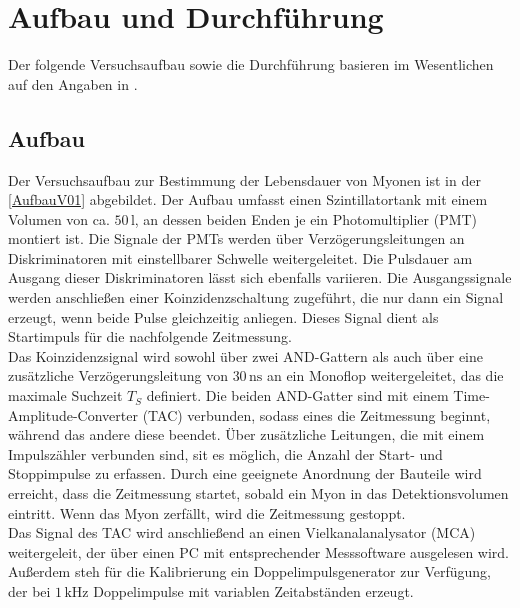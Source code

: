 \section{Aufbau und Durchführung}
Der folgende Versuchsaufbau sowie die Durchführung basieren im Wesentlichen auf den Angaben in \cite{anleitungV01}.
\subsection{Aufbau}
\label{Aufbau}
Der Versuchsaufbau zur Bestimmung der Lebensdauer von Myonen ist in der \autoref{AufbauV01} abgebildet.
Der Aufbau umfasst einen Szintillatortank mit einem Volumen von ca. $50\,\unit{\litre}$, an dessen beiden Enden je ein Photomultiplier (PMT) montiert ist. Die Signale der PMTs werden über
Verzögerungsleitungen an Diskriminatoren mit einstellbarer Schwelle weitergeleitet. Die Pulsdauer am Ausgang dieser Diskriminatoren lässt sich ebenfalls
variieren. Die Ausgangssignale werden anschließen einer Koinzidenzschaltung zugeführt, die nur dann ein Signal erzeugt, wenn beide Pulse gleichzeitig anliegen.
Dieses Signal dient als Startimpuls für die nachfolgende Zeitmessung.\\
Das Koinzidenzsignal wird sowohl über zwei AND-Gattern als auch über eine zusätzliche Verzögerungsleitung von $30\,\unit{\nano\second}$ an ein Monoflop
weitergeleitet, das die maximale Suchzeit $T_S$ definiert. Die beiden AND-Gatter sind mit einem Time-Amplitude-Converter (TAC) verbunden, sodass eines die 
Zeitmessung beginnt, während das andere diese beendet. Über zusätzliche Leitungen, die mit einem Impulszähler verbunden sind, sit es möglich, die Anzahl der
Start- und Stoppimpulse zu erfassen. Durch eine geeignete Anordnung der Bauteile wird erreicht, dass die Zeitmessung startet, sobald ein Myon in das Detektionsvolumen
eintritt. Wenn das Myon zerfällt, wird die Zeitmessung gestoppt.\\
Das Signal des TAC wird anschließend an einen Vielkanalanalysator (MCA) weitergeleit, der über einen PC mit entsprechender Messsoftware ausgelesen wird. Außerdem steh 
für die Kalibrierung ein Doppelimpulsgenerator zur Verfügung, der bei $1\,\unit{\kilo\hertz}$ Doppelimpulse mit variablen Zeitabständen erzeugt.
